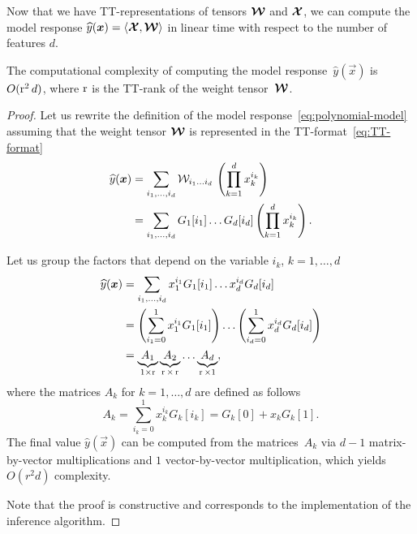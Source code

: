 Now that we have TT-representations of tensors $\boldsymbol{\mathcal{W}}$ and $\boldsymbol{\mathcal{X}}$, we can compute the model response $\widehat{y}(\boldsymbol{x}) = \langle \boldsymbol{\mathcal{X}}, \boldsymbol{\mathcal{W}} \rangle$ in linear time with respect to the number of features $d$.
\begin{theorem}
\label{thm:inference-time}
The computational complexity of computing the model response~$\widehat{y}(\vec{x})$ is $O(\operatorname{r}^2 d)$, where $\operatorname{r}$ is the TT-rank of the weight tensor~$\boldsymbol{\mathcal{W}}$.
\end{theorem}

\begin{proof}
  Let us rewrite the definition of the model response~\eqref{eq:polynomial-model} assuming that the weight tensor $\boldsymbol{\mathcal{W}}$ is represented in the TT-format~\eqref{eq:TT-format}
\begin{equation*}
\begin{aligned}
\widehat{y}(\boldsymbol{x}) &= \sum_{i_1, \ldots, i_d} \mathcal{W}_{i_1 \ldots i_d} \, \left ( \prod_{k=1}^d x_k^{i_k} \right )\\
&= \sum_{i_1, \ldots, i_d} G_1[i_1] \ldots G_d[i_d] \left ( \prod_{k=1}^d x_k^{i_k} \right ).
\end{aligned}
\end{equation*}

Let us group the factors that depend on the variable $i_k$, $k=1, \ldots, d$
\begin{equation*}
\begin{aligned}
\widehat{y}(\boldsymbol{x}) &= \sum_{i_1, \ldots, i_d}  x_1^{i_1} G_1[i_1] \ldots x_d^{i_d} G_d[i_d]\\
&= \left ( \sum_{i_1=0}^1 x_1^{i_1} G_1[i_1] \right ) \ldots \left ( \sum_{i_d=0}^1 x_d^{i_d} G_d[i_d] \right )\\
&= \underbrace{A_1}_{1 \times \operatorname{r}} \underbrace{A_2}_{\operatorname{r} \times \operatorname{r}} \ldots \underbrace{A_d}_{\operatorname{r} \times 1},
\end{aligned}
\end{equation*}
where the matrices $A_k$ for $k=1, \ldots, d$ are defined as follows
\begin{equation*}
A_k = \sum_{i_k=0}^1 x_k^{i_k} G_k[i_k] = G_k[0] + x_k G_k[1].
\end{equation*}
The final value $\widehat{y}(\vec{x})$ can be computed from the matrices~$A_k$ via $d-1$ matrix-by-vector multiplications and $1$ vector-by-vector multiplication, which yields $O(r^2 d)$ complexity.

Note that the proof is constructive and corresponds to the implementation of the inference algorithm.
\end{proof}


